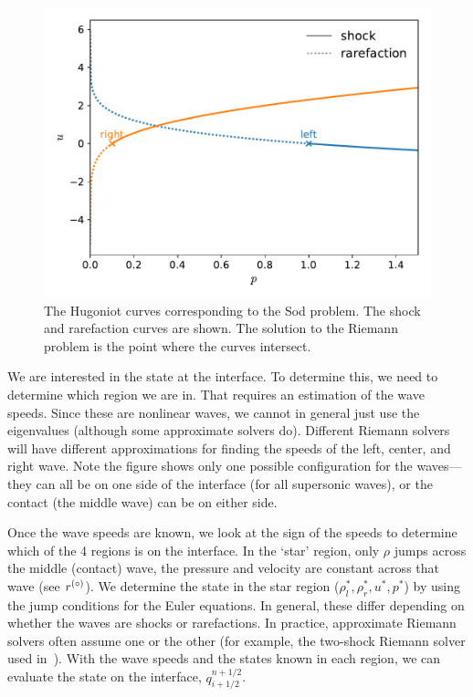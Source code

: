 \begin{figure}[t]
\centering
\includegraphics[width=0.8\linewidth]{riemann-phase}
\caption{\label{fig:euler:riemann-curve} The Hugoniot curves corresponding
to the Sod problem.  The shock and rarefaction curves are shown.  The
solution to the Riemann problem is the point where the curves intersect.\\
}
\end{figure}

We are interested in the state at the interface.  To
determine this, we need to determine which region we are in.  That
requires an estimation of the wave speeds.  Since these are nonlinear
waves, we cannot in general just use the eigenvalues (although some
approximate solvers do).  Different Riemann solvers will have
different approximations for finding the speeds of the left, center,
and right wave.  Note the figure shows only one possible configuration
for the waves---they can all be on one side of the interface (for
all supersonic waves), or the contact (the middle wave) can be on either
side.

Once the wave speeds are known, we look at the sign of the speeds to
determine which of the 4 regions is on the interface.  In the `star'
region, only $\rho$ jumps across the middle (contact) wave, the
pressure and velocity are constant across that wave (see $r^{(\circ)}$).
We determine the state in the star region ($\rho_l^*, \rho_r^*, u^*,
p^*$) by using the jump conditions for the Euler equations.  In
general, these differ depending on whether the waves are shocks or
rarefactions.  In practice, approximate Riemann solvers often assume
one or the other (for example, the two-shock Riemann solver used
in~\cite{colellaglaz:1985}).  With the wave speeds and the states
known in each region, we can evaluate the state on the interface,
$q_{i+1/2}^{n+1/2}$.

